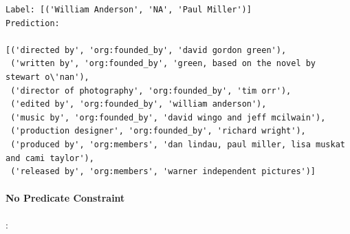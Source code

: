 \documentclass{article}
\begin{document}
\begin{lstlisting}
Label: [('William Anderson', 'NA', 'Paul Miller')]
Prediction: 

[('directed by', 'org:founded_by', 'david gordon green'),
 ('written by', 'org:founded_by', 'green, based on the novel by stewart o\'nan'),
 ('director of photography', 'org:founded_by', 'tim orr'),
 ('edited by', 'org:founded_by', 'william anderson'),
 ('music by', 'org:founded_by', 'david wingo and jeff mcilwain'),
 ('production designer', 'org:founded_by', 'richard wright'),
 ('produced by', 'org:members', 'dan lindau, paul miller, lisa muskat and cami taylor'),
 ('released by', 'org:members', 'warner independent pictures')]
\end{lstlisting}
\paragraph{No Predicate Constraint}:
\end{document}
